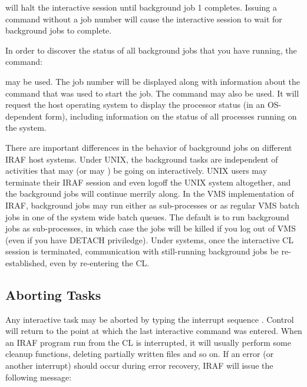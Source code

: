 \noindent
will halt the interactive session until background job 1 completes. Issuing
a  command without a job number will cause the interactive
session to wait for  background jobs to complete.

In order to discover the status of all background jobs that you
have running, the command:

\begin{quotation}\noindent
{} 
\end{quotation}

\noindent
may be used.  The job number will be displayed along with information
about the command that was used to start the job.
The command  may also be used.  It will request the host
operating system to display the processor status (in an OS-dependent form),
including information on the status of all processes running on the system.

There are important differences in the behavior of background jobs on different
IRAF host systems.  Under UNIX, the background tasks are independent of
activities that may (or may ) be going on interactively. 
UNIX users may terminate their IRAF session and even logoff the UNIX system
altogether, and the background jobs will continue merrily along.
In the VMS implementation of IRAF, background jobs may run either as
sub-processes or as regular VMS batch jobs in one of the system wide batch
queues.  The default is to run background jobs as sub-processes, in which
case the jobs will be killed if you log out of VMS (even if you have DETACH
priviledge).  Under  systems, once the interactive CL session
is terminated, communication with still-running background jobs
 be re-established, even by re-entering the CL.

\subsection{Aborting Tasks}

\ppind
Any interactive task may be aborted by typing the interrupt sequence 
.
Control will return to the point at which the last interactive command was
entered.  When an IRAF program run from the CL is interrupted, it will
usually perform some cleanup functions, deleting partially written files and
so on.  If an error (or another interrupt) should occur during error recovery,
IRAF will issue the following message:

